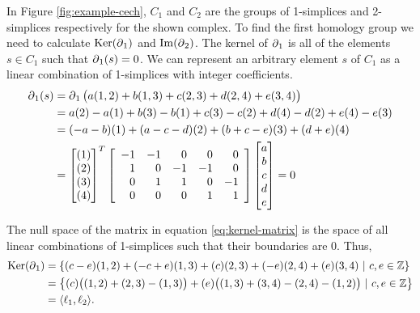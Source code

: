 \begin{example}
    In Figure \ref{fig:example-cech}, \(C_1\) and \(C_2\) are the groups of 1-simplices and 2-simplices respectively for the shown complex.
    To find the first homology group we need to calculate \(\operatorname{Ker}(\operatorname{\partial}_1)\) and \(\operatorname{Im}(\operatorname{\partial}_2)\).
    The kernel of \(\operatorname{\partial}_1\) is all of the elements \(s \in C_1\) such that \(\operatorname{\partial}_1(s) = 0\).
    We can represent an arbitrary element \(s\) of \(C_1\) as a linear combination of 1-simplices with integer coefficients.
    \begin{align}
        \operatorname{\partial}_1(s) &= \operatorname{\partial}_1\big( a(1,2) + b(1,3) + c(2,3) + d(2,4) + e(3,4) \big) \\
        &= a(2) - a(1) + b(3) - b(1) + c(3) - c(2) + d(4) - d(2) + e(4) - e(3)\\
        &= (-a - b)(1) + (a - c - d)(2) + (b + c - e)(3) + (d + e)(4)\\
        &=  \begin{bmatrix}
                (1)\\(2)\\(3)\\(4)\\
            \end{bmatrix}^T
            \left[
            \begin{array}{rrrrr}
                -1 & -1 &  0 &  0 &  0 \\
                 1 &  0 & -1 & -1 &  0 \\
                 0 &  1 &  1 &  0 & -1 \\
                 0 &  0 &  0 &  1 &  1 \\
            \end{array}
            \right]
            \begin{bmatrix}
                a\\b\\c\\d\\e\\
            \end{bmatrix}
        = 0 \label{eq:kernel-matrix}
    \end{align}

    The null space of the matrix in equation \eqref{eq:kernel-matrix} is the space of all linear combinations of 1-simplices such that their boundaries are \(0\). Thus,
    \begin{align}
        \operatorname{Ker}(\operatorname{\partial}_1) &= \{ (c - e)(1,2) + (-c + e)(1,3) + (c)(2,3) + (-e)(2,4) + (e)(3,4)\ |\ c,e \in \mathbb{Z} \}\\
            &= \left\{ (c)\big( (1,2) + (2,3) - (1,3)\big) + (e)\big((1,3) + (3,4) - (2,4) - (1,2)\big)\ |\ c,e \in \mathbb{Z} \right\}\\
            &= \langle \ell_1, \ell_2 \rangle
        .
    \end{align}


\end{example}
